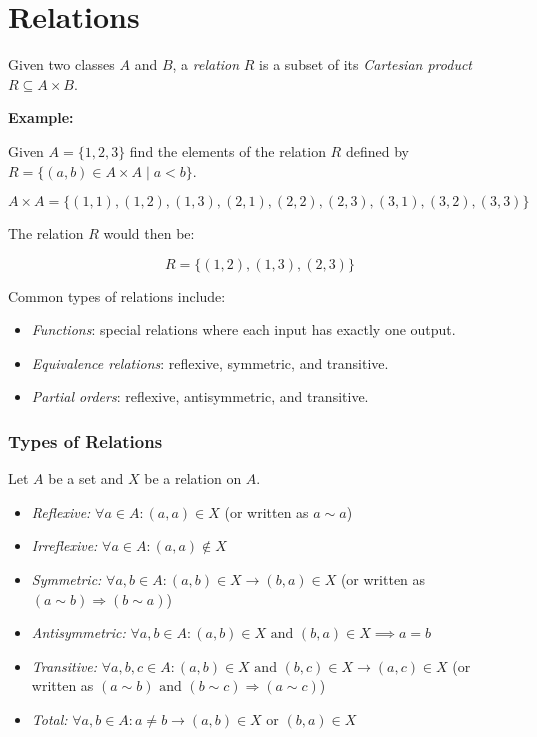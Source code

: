 \chapter{Relations}

Given two classes \(A\) and \(B\), a \emph{relation} \(R\) is a subset of its \emph{Cartesian product} \(R \subseteq A \times B\).

\textbf{Example:}

Given \(A = \{1,2,3\}\) find the elements of the relation \(R\) defined by \(R = \{(a, b) \in A \times A \mid a < b\}\).

\[
	A \times A = \{(1,1), (1,2), (1,3), (2,1), (2,2), (2,3), (3,1), (3,2), (3,3)\}
\]

The relation \(R\) would then be:

\[
	R = \{(1,2), (1,3), (2,3)\}
\]

Common types of relations include:

\begin{itemize}

	\item \emph{Functions}: special relations where each input has exactly one output.

	\item \emph{Equivalence relations}: reflexive, symmetric, and transitive.

	\item \emph{Partial orders}: reflexive, antisymmetric, and transitive.

\end{itemize}

\subsection{Types of Relations}

Let \(A\) be a set and \(X\) be a relation on \(A\).

\begin{itemize}

	\item \emph{Reflexive:} \(\forall a \in A: (a, a) \in X\) (or written as \(a \sim a\))

	\item \emph{Irreflexive:} \(\forall a \in A: (a, a) \not\in X\)

	\item \emph{Symmetric:} \(\forall a, b \in A: (a, b) \in X \to (b, a) \in X\) (or written as
	      \((a \sim b) \Rightarrow (b \sim a)\))

	\item \emph{Antisymmetric:} \(\forall a, b \in A: (a, b) \in X \text{ and } (b, a) \in X \implies a = b\)

	\item \emph{Transitive:} \(\forall a, b, c \in A: (a, b) \in X \text{ and } (b, c) \in X \to (a, c)
	      \in X\) (or written as \((a \sim b) \text{ and } (b \sim c) \Rightarrow (a \sim c)\))

	\item \emph{Total:} \(\forall a,b \in A: a \neq b \to (a, b) \in X \text{ or } (b, a) \in X\)

\end{itemize}

